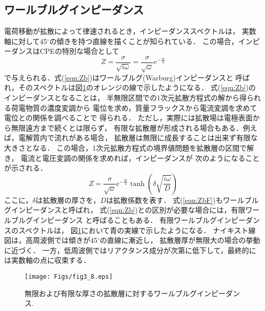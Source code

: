 \subsection{ワールブルグインピーダンス}
電荷移動が拡散によって律速されるとき，インピーダンススペクトルは，
実数軸に対して45$^\circ$の傾きを持つ直線を描くことが知られている．
この場合，インピーダンスはCPEの特別な場合として
\begin{equation}
	Z=\frac{\sigma}{\sqrt{i\omega}}
	=
	\frac{\sigma}{\sqrt{\omega}}e^{-\frac{i\pi}{4}}
	\label{eqn:Zb}
\end{equation}
で与えられる．式(\ref{eqn:Zb})はワールブルグ(Warburg)インピーダンスと
呼ばれ，そのスペクトルは図\ref{fig:fig3_8}のオレンジの線で示したようになる．
式(\ref{eqn:Zb})のインピーダンスとなることは，
半無限区間での1次元拡散方程式の解から得られる荷電物質の濃度変調から
電位を求め，質量フラックスから電流変調を求めて電位との関係を調べることで
得られる．
ただし，実際には拡散場は電極表面から無限遠方まで続くとは限らず，
有限な拡散層が形成される場合もある．例えば，電解質内で流れがある場合，
拡散層は無限に成長することは出来ず有限な大きさとなる．
この場合，1次元拡散方程式の境界値問題を拡散層の区間で解き，
電流と電圧変調の関係を求めれば，インピーダンスが
次のようになることが示される．
\begin{equation}
	Z=
	\frac{\sigma}{\sqrt{\omega}}e^{-\frac{i\pi}{4}}
	\tanh \left( \delta \sqrt{\frac{i\omega}{D}}\right)
	\label{eqn:ZbF}
\end{equation}
ここに，$\delta$は拡散層の厚さを，$D$は拡散係数を表す．
式(\ref{eqn:ZbF})もワールブルグインピーダンスと呼ばれ，
式(\ref{eqn:Zb})との区別が必要な場合には，有限ワールブルグインピーダンス
と呼ばることもある．
有限ワールブルグインピーダンスのスペクトルは，
図\ref{fig:fig3_8}において青の実線で示したようになる．
ナイキスト線図は，高周波側では傾きが45$^\circ$の直線に漸近し，
拡散層厚が無限大の場合の挙動に近づく．
一方，低周波側ではリアクタンス成分が次第に低下して，最終的には実数軸の点に収束する．
\begin{figure}[h]
	\begin{center}
	\texttt{[image: Figs/fig3\_8.eps]} 
	\end{center}
	\caption{
		無限および有限な厚さの拡散層に対するワールブルグインピーダンス.
	} 
	\label{fig:fig3_8}
\end{figure}
